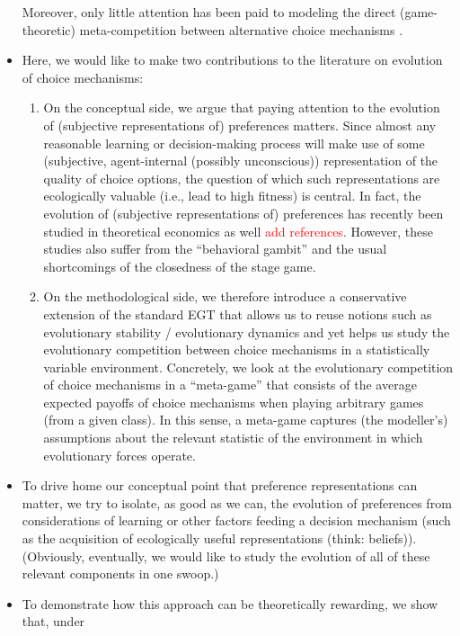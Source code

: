 \documentclass[fleqn,reqno,11pt]{article}
\newcommand{\myalert}[1]{\textcolor{red}{#1}}
\begin{document}
\begin{itemize}
    Moreover, only little attention has been paid to
  modeling the direct (game-theoretic) meta-competition between alternative choice mechanisms
  \citep[see][for related criticism]{FawcettHamblin2013:Exposing-the-be}.
\item Here, we would like to make two contributions to the literature on evolution of choice
  mechanisms:
  \begin{enumerate}
  \item On the conceptual side, we argue that paying attention to the evolution of (subjective
    representations of) preferences matters. Since almost any reasonable learning or
    decision-making process will make use of some (subjective, agent-internal (possibly
    unconscious)) representation of the quality of choice options, the question of which such
    representations are ecologically valuable (i.e., lead to high fitness) is central. In fact,
    the evolution of (subjective representations of) preferences has recently been studied in
    theoretical economics as well \myalert{add references}. However, these studies also suffer
    from the ``behavioral gambit'' and the usual shortcomings of the closedness of the stage game. 
  \item On the methodological side, we therefore introduce a conservative extension of the
    standard EGT that allows us to reuse notions such as evolutionary stability / evolutionary
    dynamics and yet helps us study the evolutionary competition between choice mechanisms in a
    statistically variable environment. Concretely, we look at the evolutionary competition of
    choice mechanisms in a ``meta-game'' that consists of the average expected payoffs of
    choice mechanisms when playing arbitrary games (from a given class). In this sense, a
    meta-game captures (the modeller's) assumptions about the relevant statistic of the
    environment in which evolutionary forces operate.
  \end{enumerate}
\item To drive home our conceptual point that preference representations can matter, we try to
  isolate, as good as we can, the evolution of preferences from considerations of learning or
  other factors feeding a decision mechanism (such as the acquisition of ecologically useful
  representations (think: beliefs)). (Obviously, eventually, we would like to study the
  evolution of all of these relevant components in one swoop.)
\item To demonstrate how this approach can be theoretically rewarding, we show that, under

\end{itemize}
\end{document}
